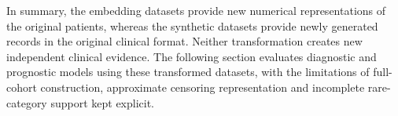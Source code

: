 In summary, the embedding datasets provide new numerical representations of the
original patients, whereas the synthetic datasets provide newly generated
records in the original clinical format. Neither transformation creates new
independent clinical evidence. The following section evaluates diagnostic and
prognostic models using these transformed datasets, with the limitations of
full-cohort construction, approximate censoring representation and incomplete
rare-category support kept explicit.
\FloatBarrier
